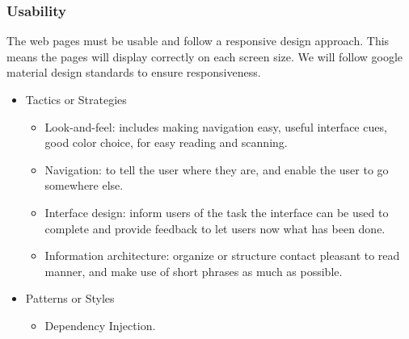 \subsubsection{Usability}
		The web pages must be usable and follow a responsive design approach. This means the pages will display correctly on each screen size. We will follow google material design standards to ensure responsiveness.
		\begin{itemize}
	\item{Tactics or Strategies}
		\begin{itemize}
			\item Look-and-feel: includes making navigation easy, useful interface cues, good color choice, for easy reading and scanning.
			\item Navigation: to tell the user where they are, and enable the user to go somewhere else.
			\item Interface design: inform users of the task the interface can be used to complete and provide feedback to let users now what has been done.
			\item Information architecture: organize or structure contact pleasant to read manner, and make use of short phrases as much as possible.
		\end{itemize}
	\item{Patterns or Styles}
		\begin{itemize}
			\item Dependency Injection.
		\end{itemize}
\end{itemize}
		
